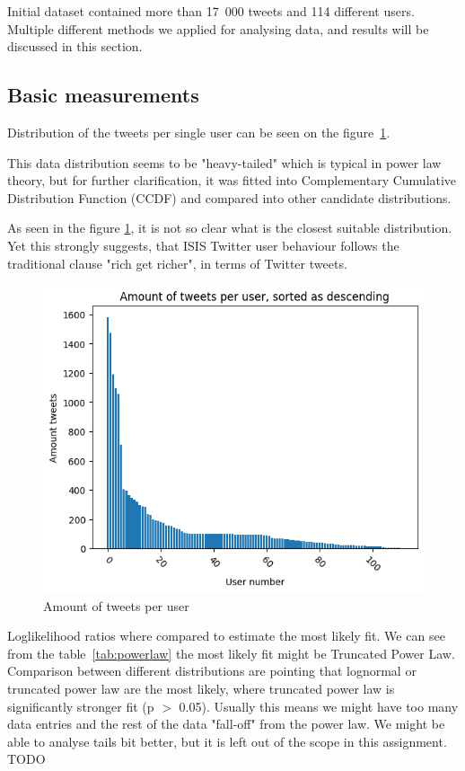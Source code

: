 \documentclass[conference]{IEEEtran}
\begin{document}
Initial dataset contained more than 17~000 tweets and 114 different users.
Multiple different methods we applied for analysing data, and results will be discussed in this section.

\subsection{Basic measurements}

Distribution of the tweets per single user can be seen on the figure~\ref{fig:amount-tweets-user}.

This data distribution seems to be "heavy-tailed" which is typical in power law theory, but for further clarification,
it was fitted into Complementary Cumulative Distribution Function (CCDF) and compared into other candidate distributions.

As seen in the figure \ref{fig:amount-tweets-user}, it is not so clear what is the closest suitable distribution.
Yet this strongly suggests, that ISIS Twitter user behaviour follows the traditional clause "rich get richer", in terms of Twitter tweets.

\begin{figure}
    \includegraphics[scale=0.6]{figures/amount_tweets_per_user}
     \caption{Amount of tweets per user}
    \label{fig:amount-tweets-user}
\end{figure}

Loglikelihood ratios where compared to estimate the most likely fit.
We can see from the table~\ref{tab:powerlaw} the most likely fit might be Truncated Power Law.
Comparison between different distributions are pointing that lognormal or truncated power law are the most likely, where truncated power law is significantly stronger fit (p $>$ 0.05).
Usually this means we might have too many data entries and the rest of the data "fall-off" from the power law.
We might be able to analyse tails bit better, but it is left out of the scope in this assignment.
TODO
\end{document}
